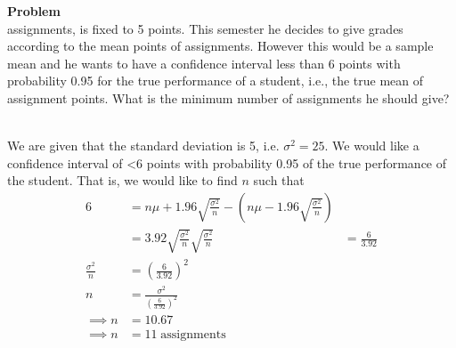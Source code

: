 \documentclass[12pt]{article}
\newenvironment{Ex}{\textbf{Problem}\vspace{.75em}\\}{}
\begin{document}
\begin{enumerate}
\begin{Ex}
    assignments, is fixed to 5 points. This semester he decides to
    give grades according to the mean points of assignments. However
    this would be a sample mean and he wants to have a confidence
    interval less than 6 points with probability 0.95 for the true
    performance of a student, i.e., the true mean of assignment
    points. What is the minimum number of assignments he should give?
    \begin{solution} \hfill \vspace{.75em} \\
      We are given that the standard deviation is 5, i.e.
      $\sigma^2 = 25$. We would like a confidence interval of <6
      points with probability 0.95 of the true performance of the
      student. That is, we would like to find $n$ such that
      \begin{equation}
        \label{eq:6-equation}
        \begin{aligned}
          6 &= n\mu + 1.96\sqrt{\frac{\sigma^2}{n}} - (n\mu -
          1.96\sqrt{{\frac{\sigma^2}{n}}}) \\
          & = 3.92\sqrt{\frac{\sigma^2}{n}}
          \sqrt{\frac{\sigma^2}{n}} &= \frac{6}{3.92} \\
          \frac{\sigma^2}{n} &= \left(\frac{6}{3.92}\right)^2 \\
          n &= \frac{\sigma^2}{\left(\frac{6}{3.92}\right)^2} \\
          \implies n &= 10.67 \\
          \implies n &= 11\;\text{assignments} \\
        \end{aligned}
      \end{equation}
    \end{solution}
  \end{Ex}
\end{enumerate}
\end{document}
